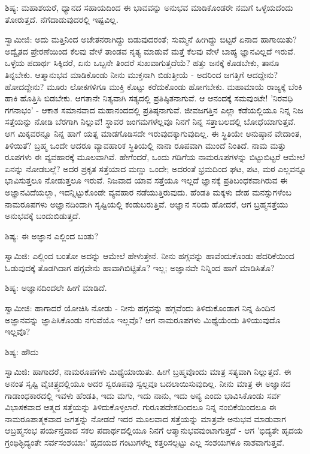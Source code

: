 ಶಿಷ್ಯ: ಮಹಾಶಯರೆ, ಧ್ಯಾನದ ಸಹಾಯದಿಂದ ಈ ಭಾವವನ್ನು ಅನುಭವ ಮಾಡಿಕೊಂಡರೇ ನಮಗೆ ಒಳ್ಳೆಯದೆಂದು ತೋರುತ್ತದೆ. ನೆಗೆದಾಡುವುದರಲ್ಲಿ ಇಷ್ಟವಿಲ್ಲ.

ಸ್ವಾಮೀಜಿ: ಅದು ಮತ್ತಿನಿಂದ ಅಚೇತನರಾಗಿದ್ದು ಬಿಡುವುದರಂತೆ; ಸುಮ್ಮನೆ ಹೀಗಿದ್ದು ಬಿಟ್ಟರೆ ಏನಾದ ಹಾಗಾಯಿತು? ಅದ್ವೈತದ ಪ್ರೇರಣೆಯಿಂದ ಕೆಲವು ವೇಳೆ ತಾಂಡವ ನೃತ್ಯ ಮಾಡುವೆ ಮತ್ತೆ ಕೆಲವು ವೇಳೆ ಬಾಹ್ಯ ಜ್ಞಾನವಿಲ್ಲದೆ ಇರುವೆ. ಒಳ್ಳೆಯ ಪದಾರ್ಥ ಸಿಕ್ಕಿದರೆ, ಏನು ಒಬ್ಬನೇ ತಿಂದರೆ ಸುಖವಾಗುತ್ತದೆಯೆ? ಹತ್ತು ಜನಕ್ಕೆ ಕೊಡಬೇಕು, ತಾನೂ ತಿನ್ನಬೇಕು. ಆತ್ಮಾನುಭವ ಮಾಡಿಕೊಂಡು ನೀನು ಮುಕ್ತನಾಗಿ ಬಿಡುತ್ತೀಯೆ - ಅದರಿಂದ ಜಗತ್ತಿಗೆ ಆದದ್ದೇನು? ಹೋದದ್ದೇನು? ಮೂರು ಲೋಕಗಳಿಗೂ ಮುಕ್ತಿ ಕೊಟ್ಟು ಕರೆದುಕೊಂಡು ಹೋಗಬೇಕು. ಮಹಾಮಾಯೆ ರಾಜ್ಯಕ್ಕೆ ಬೆಂಕಿ ಹಾಕಿ ಹೊತ್ತಿಸಿ ಬಿಡಬೇಕು. ಆಗತಾನೇ ನಿತ್ಯವಾಗಿ ಸತ್ಯದಲ್ಲಿ ಪ್ರತಿಷ್ಠಿತನಾಗುವೆ. ಆ ಆನಂದಕ್ಕೆ ಸಮವುಂಟೇ! 'ನಿರವಧಿ ಗಗನಾಭಂ' - ಆಕಾಶ ಸಮಾನವಾದ ಮಹಾನಂದದಲ್ಲಿ ಪ್ರತಿಷ್ಠನಾಗುವೆ. ಜೀವಜಗತ್ತಿನ ಎಲ್ಲಾ ಕಡೆಯಲ್ಲಿಯೂ ನಿನ್ನ ನಿಜ ಸತ್ತೆಯನ್ನು ನೋಡಿ ಬೆರಗಾಗಿ ನಿಲ್ಲುವೆ! ಸ್ಥಾವರ ಜಂಗಮಗಳೆಲ್ಲವೂ ನಿನಗೆ ನಿನ್ನ ಸತ್ತಾಬಲದಲ್ಲಿ ಬೋಧೆಯಾಗುತ್ತವೆ. ಆಗ ಮಿಕ್ಕವರನ್ನೂ ನಿನ್ನ ಹಾಗೆ ಯತ್ನ ಮಾಡಗೊಡಿಸದೇ ಇರುವುದಕ್ಕಾಗುವುದಿಲ್ಲ. ಈ ಸ್ಥಿತಿಯೇ ಅನುಷ್ಠಾನ ವೇದಾಂತ, ತಿಳಿಯಿತೆ? ಬ್ರಹ್ಮ ಒಂದೇ ಆದರೂ ವ್ಯಾವಹಾರಿಕ ಸ್ಥಿತಿಯಲ್ಲಿ ನಾನಾ ರೂಪವಾಗಿ ಮುಂದೆ ನಿಂತಿದೆ. ನಾಮ ಮತ್ತು ರೂಪಗಳು ಈ ವ್ಯವಹಾರಕ್ಕೆ ಮೂಲವಾಗಿವೆ. ಹೇಗೆಂದರೆ, ಒಂದು ಗಡಿಗೆಯ ನಾಮರೂಪಗಳನ್ನು ಬಿಟ್ಟುಬಿಟ್ಟರೆ ಆಮೇಲೆ ಏನನ್ನು ನೋಡಬಲ್ಲೆ? ಅದರ ಪ್ರಕೃತ ಸತ್ತೆಯಾದ ಮಣ್ಣು ಒಂದೇ; ಅದರಂತೆ ಭ್ರಮದಿಂದ ಘಟ, ಪಟ, ಮಠ ಎಲ್ಲವನ್ನೂ ಭಾವಿಸುತ್ತಲೂ ನೋಡುತ್ತಲೂ ಇರುವೆ. ನಿಜವಾದ ಯಾವ ಸತ್ತೆಯೂ ಇಲ್ಲದೆ ಜ್ಞಾನಕ್ಕೆ ಪ್ರತಿಬಂಧಕವಾಗಿರುವ ಈ ಅಜ್ಞಾನವಿದೆಯಲ್ಲಾ, ಇದನ್ನಿಟ್ಟುಕೊಂಡೇ ವ್ಯವಹಾರ ನಡೆಯುತ್ತಿರುವುದು. ಹೆಂಡತಿ ಮಕ್ಕಳು ದೇಹ ಮನಸ್ಸುಗಳೆಂಬ ನಾಮರೂಪಗಳು ಅಜ್ಞಾನದಿಂದಾಗಿ ಸೃಷ್ಟಿಯಲ್ಲಿ ಕಂಡುಬರುತ್ತಿವೆ. ಅಜ್ಞಾನ ಸರಿದು ಹೋದರೆ, ಆಗ ಬ್ರಹ್ಮಸತ್ತೆಯು ಅನುಭವಕ್ಕೆ ಬಂದುಬಿಡುತ್ತದೆ.

ಶಿಷ್ಯ: ಈ ಅಜ್ಞಾನ ಎಲ್ಲಿಂದ ಬಂತು?

ಸ್ವಾಮಿಜಿ: ಎಲ್ಲಿಂದ ಬಂತೋ ಅದನ್ನು ಆಮೇಲೆ ಹೇಳುತ್ತೇನೆ. ನೀನು ಹಗ್ಗವನ್ನು ಹಾವೆಂದುಕೊಂಡು ಹೆದರಿಕೆಯಿಂದ ಓಡುವುದಕ್ಕೆ ತೊಡಗಿದಾಗ ಹಗ್ಗವೇನು ಹಾವಾಗಿಬಿಟ್ಟಿತೊ? ಇಲ್ಲ; ಅಜ್ಞಾನವೇ ನಿನ್ನಿಂದ ಹಾಗೆ ಮಾಡಿಸಿತೊ?

ಶಿಷ್ಯ: ಅಜ್ಞಾನದಿಂದಲೇ ಹೀಗೆ ಮಾಡಿದೆ.

ಸ್ವಾಮೀಜಿ: ಹಾಗಾದರೆ ಯೋಚಿಸಿ ನೋಡು - ನೀನು ಹಗ್ಗವನ್ನು ಹಗ್ಗವೆಂದು ತಿಳಿದುಕೊಂಡಾಗ ನಿನ್ನ ಹಿಂದಿನ ಅಜ್ಞಾನವನ್ನು ಜ್ಞಾಪಿಸಿಕೊಂಡು ನಗುವೆಯೊ ಇಲ್ಲವೊ? ಆಗ ನಾಮರೂಪಗಳು ಮಿಥ್ಯೆಯೆಂದು ತಿಳಿಯುವುದೊ ಇಲ್ಲವೊ?

ಶಿಷ್ಯ: ಹೌದು

ಸ್ವಾಮಿಜಿ: ಹಾಗಾದರೆ, ನಾಮರೂಪಗಳು ಮಿಥ್ಯೆಯಾಯಿತು. ಹೀಗೆ ಬ್ರಹ್ಮವೊಂದು ಮಾತ್ರ ಸತ್ಯವಾಗಿ ನಿಲ್ಲುತ್ತದೆ. ಈ ಅನಂತ ಸೃಷ್ಟಿ ವೈಚಿತ್ರ್ಯದಲ್ಲಿಯೂ ಅದರ ಸ್ವರೂಪವು ಸ್ವಲ್ಪವೂ ಬದಲಾಯಿಸುವುದಿಲ್ಲ. ನೀನು ಮಾತ್ರ ಈ ಅಜ್ಞಾನದ ಗಾಡಾಂಧಕಾರದಲ್ಲಿ ಇವಳು ಹೆಂಡತಿ, ಇದು ಮಗು, ಇದು ನಾನು, ಇದು ಅನ್ಯ ಎಂದು ಭಾವಿಸಿಕೊಂಡು ಸರ್ವ ವಿಭಾಸಕವಾದ ಆತ್ಮದ ಸತ್ತೆಯನ್ನು ತಿಳಿದುಕೊಳ್ಳಲಾರೆ. ಗುರೂಪದೇಶದಿಂದಲೂ ನಿನ್ನ ನಂಬಿಕೆಯಿಂದಲೂ ಈ ನಾಮರೂಪಾತ್ಮಕವಾದ ಜಗತ್ತನ್ನು ನೋಡದೆ ಇದರ ಮೂಲವಾದ ಸತ್ತೆಯನ್ನು ಮಾತ್ರವೇ ಅನುಭವ ಮಾಡುವಾಗ ಆಬ್ರಹ್ಮಸಂಭ ಪರ್ಯನ್ತವಾದ ಸಕಲ ಪದಾರ್ಥದಲ್ಲಿಯೂ ನಿನಗೆ ಆತ್ಮಾನುಭವವುಂಟಾಗುತ್ತದೆ - ಆಗ 'ಭಿದ್ಯತೇ ಹೃದಯ ಗ್ರಂಥಿಶ್ಛಿದ್ಯಂತೇ ಸರ್ವಸಂಶಯಾಃ' ಹೃದಯದ ಗಂಟುಗಳೆಲ್ಲ ಕತ್ತರಿಸಲ್ಪಟ್ಟು ಎಲ್ಲ ಸಂಶಯಗಳೂ ನಾಶವಾಗುತ್ತವೆ.

